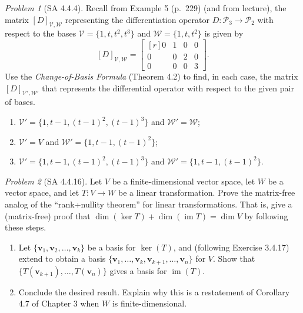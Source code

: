 \documentclass[fleqn,11pt]{paper}
\theoremstyle{remark}
\newtheorem{problem}{Problem}
\newtheorem*{solution}{{\bf Solution}}
\renewcommand{\ker}{\ensuremath{\operatorname{ker}}}
\renewcommand{\dim}{\ensuremath{\operatorname{dim}}}
\newcommand\im{\ensuremath{\operatorname{im}}}
\renewcommand{\vec}[1]{\mathbf{#1}}
\newcommand{\<}{\ensuremath{\langle}}
\renewcommand{\>}{\ensuremath{\rangle}}
\newcommand\vv{\vec{v}}
\newcommand\sV{\ensuremath{\mathcal V}}
\newcommand\sW{\ensuremath{\mathcal W}}
\begin{document}
\begin{problem}[SA 4.4.4]
Recall from  Example 5 (p.~229) (and from lecture), 
the matrix $[D]_{\sV, \sW}$ representing the differentiation operator 
$D : \mathcal{P}_3 \to \mathcal{P}_2$ with respect to the bases
$\sV = \{1, t, t^2 , t^3 \}$ and $\sW = \{1, t, t^2\}$ is given by
\[
[D]_{\sV, \sW} = \begin{bmatrix*}[r] 
0 & 1 & 0 & 0 \\ 
0 & 0 & 2 & 0 \\
0 & 0 & 0 & 3
\end{bmatrix*}.
\]
Use the \emph{Change-of-Basis Formula} (Theorem 4.2) to find, 
in each case, the matrix $[D]_{\sV', \sW'}$ that represents the differential operator
with respect to the given pair of bases.
\begin{enumerate}[{\bf a.}]
\item 
$\sV' = \{1, t - 1, (t - 1)^2 , (t - 1)^3 \}$ and  $\sW' = \sW$;
\item 
$\sV' = V$ and $\sW' = \{1, t - 1, (t - 1)^2 \}$;
\item
$\sV' = \{1, t - 1, (t - 1)^2 , (t - 1)^3 \}$ and $\sW' = \{1, t - 1, (t - 1)^2 \}$.
\end{enumerate}
\end{problem}

\newpage

\begin{problem}[SA 4.4.16]
  \label{prob2}
Let $V$ be a finite-dimensional vector space, let $W$ be a vector space, and let 
$T : V \to W$ be a linear transformation. 
Prove the matrix-free analog of the ``rank+nullity theorem'' for linear transformations.
That is, give a (matrix-free) proof that $\dim(\ker T) + \dim(\im T) = \dim V$
by following these steps.
\begin{enumerate}[{\bf a.}]
\item 
Let $\{\vv_1, \vv_2, \dots, \vv_k\}$ 
be a basis for $\ker(T)$, and (following Exercise 3.4.17) 
extend to obtain a basis $\{\vv_1, \dots, \vv_k, \vv_{k+1},\dots, \vv_n\}$ 
for $V$. Show that $\{T(\vv_{k+1}), \dots, T(\vv_n)\}$
gives a basis for $\im(T)$.
\item Conclude the desired result. Explain why this is a restatement of
  Corollary 4.7 of Chapter 3 when $W$ is finite-dimensional.
\end{enumerate}
\end{problem}
\medskip
\end{document}
